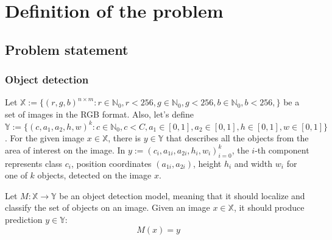 \documentclass[14pt,a4paper]{extarticle}
\newcounter{e}
\numberwithin{equation}{section}
\numberwithin{figure}{section}
\begin{document}
\newpage
\thispagestyle{empty}


\section{Definition of the problem}

\subsection{Problem statement}
\subsubsection{Object detection}
Let $\mathbb{X} := \{(r, g, b)^{n \times m} : r \in \mathbb{N}_0, r < 256,  g \in \mathbb{N}_0, g < 256, b \in \mathbb{N}_0, b < 256, \}$ be a set of images in the RGB format. Also, let's define $\mathbb{Y}:=\{(c, a_{1}, a_{2}, h, w)^k : c \in \mathbb{N}_0, c<C, a_1 \in [0, 1], a_2 \in [0, 1], h \in [0, 1], w \in [0, 1]\}$. For the given image $x \in \mathbb{X}$, there is $y \in \mathbb{Y}$ that describes all the objects from the area of interest on the image. In $y:=(c_i, a_{1i}, a_{2i}, h_i, w_i)^k_{i=0}$, the $i$-th component represents class $c_i$, position coordinates $(a_{1i}, a_{2i})$, height $h_i$ and width $w_i$ for one of $k$ objects, detected on the image $x$.

Let $M: \mathbb{X} \rightarrow \mathbb{Y}$ be an object detection model, meaning that it should localize and classify the set of objects on an image. Given an image $x \in \mathbb{X}$, it should produce prediction $y \in \mathbb{Y}$:
\begin{equation}
    M(x)=y
\end{equation}
\end{document}
